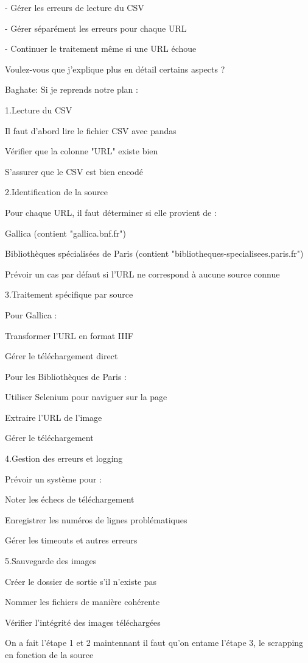 - Gérer les erreurs de lecture du CSV

- Gérer séparément les erreurs pour chaque URL

- Continuer le traitement même si une URL échoue

Voulez-vous que j'explique plus en détail certains aspects ?

Baghate: Si je reprends notre plan :

1.Lecture du CSV

Il faut d'abord lire le fichier CSV avec pandas

Vérifier que la colonne "URL" existe bien

S'assurer que le CSV est bien encodé

2.Identification de la source

Pour chaque URL, il faut déterminer si elle provient de :

Gallica (contient "gallica.bnf.fr")

Bibliothèques spécialisées de Paris (contient "bibliotheques-specialisees.paris.fr")

Prévoir un cas par défaut si l'URL ne correspond à aucune source connue

3.Traitement spécifique par source

Pour Gallica :

Transformer l'URL en format IIIF

Gérer le téléchargement direct

Pour les Bibliothèques de Paris :

Utiliser Selenium pour naviguer sur la page

Extraire l'URL de l'image

Gérer le téléchargement

4.Gestion des erreurs et logging

Prévoir un système pour :

Noter les échecs de téléchargement

Enregistrer les numéros de lignes problématiques

Gérer les timeouts et autres erreurs

5.Sauvegarde des images

Créer le dossier de sortie s'il n'existe pas

Nommer les fichiers de manière cohérente

Vérifier l'intégrité des images téléchargées

On a fait l'étape 1 et 2 maintennant il faut qu'on entame l'étape 3, le scrapping en fonction de la source

